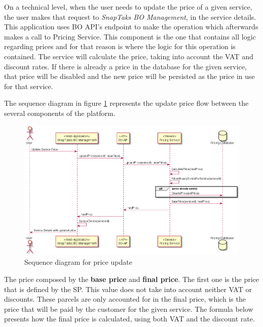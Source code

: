 \par

On a technical level, when the user needs to update the price of a given service, the user makes that request to \textit{SnapTaks BO Management}, in the service details. This application uses BO API's endpoint to make the operation which afterwards makes a call to Pricing Service. This component is the one that contains all logic regarding prices and for that reason is where the logic for this operation is contained. The service will calculate the price, taking into account the \gls{VAT} and discount rates. If there is already a price in the database for the given service, that price will be disabled and the new price will be persisted as the price in use for that service.

\par

The sequence diagram in figure \ref{fig:priceUpdate} represents the update price flow between the several components of the platform.

\begin{figure}[ht]
\centering
\includegraphics[width=\textwidth,keepaspectratio]{chapters/Implementation/assets/PriceUpdate.png}
\caption[Sequence diagram for price update]{Sequence diagram for price update}
\label{fig:priceUpdate}
\end{figure}

\par
The price composed by the \textbf{base price} and \textbf{final price}. The first one is the price that is defined by the \gls{SP}. This value does not take into account neither \gls{VAT} or discounts. These parcels are only accounted for in the final price, which is the price that will be paid by the customer for the given service. The formula below presents how the final price is calculated, using both \gls{VAT} and the discount rate.

